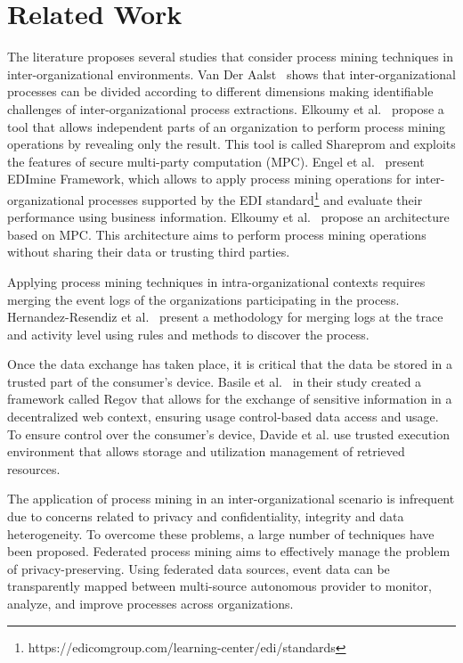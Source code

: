 \section{Related Work}
\label{sec:background}

The literature proposes several studies that consider process mining techniques in inter-organizational environments.  Van Der Aalst~\cite{van2011intra} shows that inter-organizational processes can be divided according to different dimensions making identifiable challenges of inter-organizational process extractions. Elkoumy et al.~\cite{elkoumy2020shareprom} propose a tool that allows independent parts of an organization to perform process mining operations by revealing only the result. This tool is called Shareprom and exploits the features of secure multi-party computation (MPC). Engel et al.~\cite{engel2016analyzing}
present EDImine Framework, which allows to apply process mining operations for inter-organizational processes supported by the EDI standard\footnote{https://edicomgroup.com/learning-center/edi/standards} and evaluate their performance using business information.
Elkoumy et al.~\cite{elkoumy2020secure} propose an architecture based on MPC. This architecture aims to perform process mining operations without sharing their data or trusting third parties.


Applying process mining techniques in intra-organizational contexts requires merging the event logs of the organizations participating in the process. Hernandez-Resendiz et al.~\cite{hernandez2021merging} present a methodology for merging logs at the trace and activity level using rules and methods to discover the process.
\cite{claes2014merging}
\cite{engel2014case}
\cite{engel2011process}
\cite{arfaoui2014trusted}
\cite{XIE2023321}

Once the data exchange has taken place, it is critical that the data be stored in a trusted part of the consumer's device. Basile et al.~\cite{Basile_Blockchain_based_resource_governance_for_decentralized_web_environments} in their study created a framework called Regov that allows for the exchange of sensitive information in a decentralized web context, ensuring usage control-based data access and usage. To ensure control over the consumer's device, Davide et al. use trusted execution environment that allows storage and utilization management of retrieved resources. 

The application of process mining in an inter-organizational scenario is infrequent due to concerns related to privacy and confidentiality, integrity and data heterogeneity. To overcome these problems, a large number of techniques have been proposed. Federated process mining \cite{van2021federated} aims to effectively manage the problem of privacy-preserving. Using federated data sources, event data can be transparently mapped between multi-source autonomous provider to monitor, analyze, and improve processes across organizations.

